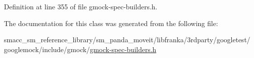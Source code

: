 Definition at line 355 of file gmock-\/spec-\/builders.\+h.



The documentation for this class was generated from the following file\+:\begin{DoxyCompactItemize}
\item 
smacc\+\_\+sm\+\_\+reference\+\_\+library/sm\+\_\+panda\+\_\+moveit/libfranka/3rdparty/googletest/googlemock/include/gmock/\hyperlink{gmock-spec-builders_8h}{gmock-\/spec-\/builders.\+h}\end{DoxyCompactItemize}
